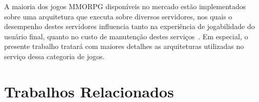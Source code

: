 A maioria dos jogos \ac{MMORPG} disponíveis no mercado estão implementados sobre uma arquitetura que executa sobre diversos servidores\cite{stephenclarkewillson2017}, nos quais o desempenho destes servidores influencia tanto na experiência de jogabilidade do usuário final, quanto no custo de manutenção destes serviços~\cite{1417630}.
%
Em especial, o presente trabalho tratará com maiores detalhes as arquiteturas utilizadas no serviço dessa categoria de jogos.

\section{Trabalhos Relacionados}
\label{sec:similares}
